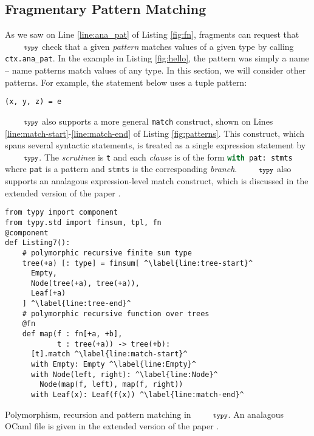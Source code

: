 \documentclass[10pt]{sigplanconf}
\newcommand{\typy}{\texttt{\footnotesize typy}}
\newcommand{\lip}[1]{\lstinline[language=Python,basicstyle=\ttfamily\footnotesize,morekeywords={with},deletendkeywords={tuple,buffer,map}]{#1}}
\newcommand{\li}[1]{\lip{#1}}
\begin{document}
\subsection{Fragmentary Pattern Matching}\label{sec:pattern-matching}
As we saw on Line \ref{line:ana_pat} of Listing \ref{fig:fn}, fragments can request that $\typy$ check that a given \emph{pattern} matches values of a given type by calling \li{ctx.ana_pat}. In the example in Listing \ref{fig:hello}, the pattern was simply a name -- name patterns match values of any type. In this section, we will consider other patterns. For example, the statement below uses a tuple pattern:
\vspace{-2px}\begin{lstlisting}[numbers=none]
(x, y, z) = e
\end{lstlisting}\vspace{-1px}

$\typy$ also supports a more general \li{match} construct, shown on Lines \ref{line:match-start}-\ref{line:match-end} of Listing \ref{fig:patterns}. This construct, which spans several syntactic statements, is treated as a single expression statement by $\typy$. The \emph{scrutinee} is \li{t} and each \emph{clause}  is of the form \li{with pat: stmts} where \li{pat} is a pattern and \li{stmts} is the corresponding \emph{branch}. $\typy$ also supports an analagous expression-level match construct, which is discussed in the extended version of the paper \cite{gpce16tr}.

\begin{codelisting}[t]
\vspace{-3px}
\begin{lstlisting}
from typy import component
from typy.std import finsum, tpl, fn
@component
def Listing7():
    # polymorphic recursive finite sum type
    tree(+a) [: type] = finsum[ ^\label{line:tree-start}^
      Empty, 
      Node(tree(+a), tree(+a)),
      Leaf(+a)
    ] ^\label{line:tree-end}^
    # polymorphic recursive function over trees
    @fn
    def map(f : fn[+a, +b], 
            t : tree(+a)) -> tree(+b):
      [t].match ^\label{line:match-start}^
      with Empty: Empty ^\label{line:Empty}^
      with Node(left, right): ^\label{line:Node}^
        Node(map(f, left), map(f, right))
      with Leaf(x): Leaf(f(x)) ^\label{line:match-end}^
\end{lstlisting}
\caption{Polymorphism, recursion and pattern matching in $\typy$. An analagous OCaml file is given in the extended version of the paper \cite{gpce16tr}.}
\label{fig:patterns}
\end{codelisting}
\end{document}
